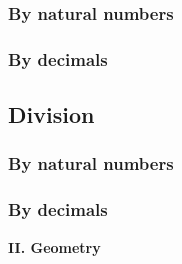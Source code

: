 \documentclass[a4paper, 12pt]{article}
\begin{document}
	\subsubsection{By natural numbers}
	\subsubsection{By decimals}
	\subsection{Division}
	\subsubsection{By natural numbers}
	\subsubsection{By decimals} \hspace{1.5cm}

	{\huge \textbf{II. Geometry}}

	
		
\end{document}
